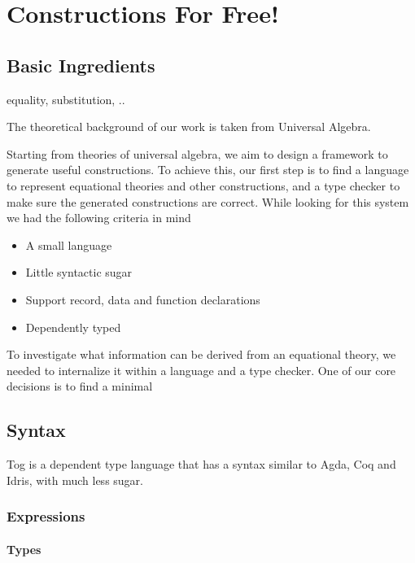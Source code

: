 \chapter{Constructions For Free!}



\section{Basic Ingredients}
equality, substitution, .. 

The theoretical background of our work is taken from Universal Algebra. 

Starting from theories of universal algebra, we aim to design a framework to generate useful constructions. To achieve this, our first step is to find a language to represent equational theories and other constructions, and a type checker to make sure the generated constructions are correct. While looking for this system we had the following criteria in mind 

\begin{itemize}
 \item A small language 
 \item Little syntactic sugar 
 \item Support record, data and function declarations 
 \item Dependently typed 
\end{itemize}


To investigate what information can be derived from an equational theory, we needed to internalize it within a language and a type checker. One of our core decisions is to find a minimal

\section{Syntax}
Tog is a dependent type language that has a syntax similar to Agda, Coq and Idris, with much less sugar. 
\subsection{Expressions}
\subsubsection{Types}


